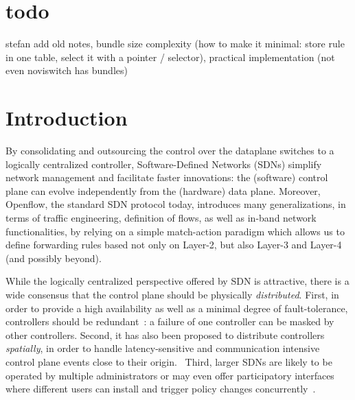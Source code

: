 \documentclass[conference]{sigcomm-alternate}
\begin{document}


\section*{todo}

stefan add old notes, bundle size complexity (how to make it minimal: store rule in one table, select it with a pointer / selector),
practical implementation (not even noviswitch has bundles)

\section{Introduction}\label{sec:intro}

By consolidating and outsourcing the control over the dataplane switches to a logically
centralized controller, Software-Defined Networks (SDNs)
simplify network management and facilitate faster innovations:
the (software) control plane can evolve independently from the
(hardware) data plane.
Moreover, Openflow, the standard SDN protocol today, introduces many generalizations,
in terms of traffic engineering, definition of flows, as well as in-band network functionalities,
by relying on a simple match-action paradigm which allows us to define
forwarding rules based not only on Layer-2, but also Layer-3 and Layer-4 (and possibly beyond).

While the logically centralized perspective offered by SDN is attractive,
there is a wide consensus that
the control plane should be physically \emph{distributed}.
First, in order to provide a high availability as well as a minimal degree of
fault-tolerance, controllers should be redundant~\cite{onix,stn,onos}: a failure
of one controller can be masked by other controllers. Second, it has also been proposed
to distribute controllers \emph{spatially}, in order to handle latency-sensitive and
communication intensive control plane events close to their origin.~\cite{devoflow,kandoo,jukka,disco}
Third, larger SDNs are likely to be operated by multiple administrators or may even offer
participatory interfaces where different users can install and trigger policy changes
concurrently~\cite{participatory,stn}.

\end{document}
